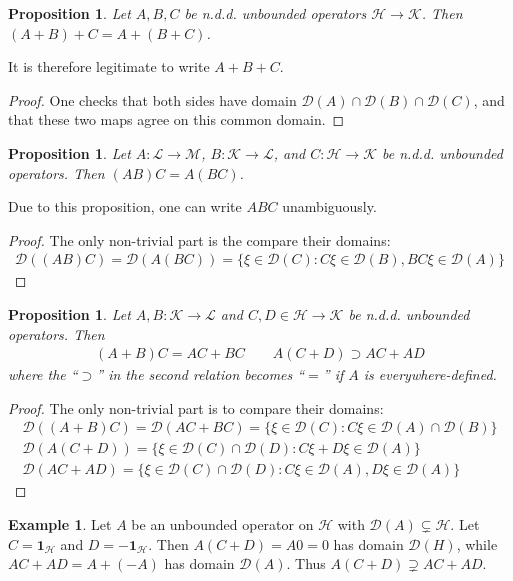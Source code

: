\documentclass[12pt,b5paper,notitlepage]{article}
\theoremstyle{definition}
\newtheorem{eg}[df]{Example}
\theoremstyle{plain}
\newtheorem{pp}[df]{Proposition}
\newcommand{\idt}{\mathbf{1}}
\newcommand{\Dom}{\mathscr{D}}
\newcommand{\MH}{\mathcal H}
\newcommand{\MK}{\mathcal K}
\newcommand{\ML}{\mathcal L}
\newcommand{\MM}{\mathcal M}
\numberwithin{equation}{section}
\begin{document}
\begin{pp}
Let $A,B,C$ be n.d.d. unbounded operators $\MH\rightarrow\MK$. Then $(A+B)+C=A+(B+C)$.
\end{pp}


It is therefore legitimate to write $A+B+C$.

\begin{proof}
One checks that both sides have domain $\Dom(A)\cap\Dom(B)\cap\Dom(C)$, and that these two maps agree on this common domain.
\end{proof}



\begin{pp}
Let $A:\ML\rightarrow\MM$, $B:\MK\rightarrow\ML$, and $C:\MH\rightarrow\MK$ be n.d.d. unbounded operators. Then $(AB)C=A(BC)$.
\end{pp}


Due to this proposition, one can write $ABC$ unambiguously.

\begin{proof}
The only non-trivial part is the compare their domains:
\begin{align*}
\Dom((AB)C)=\Dom(A(BC))=\{\xi\in\Dom(C):C\xi\in\Dom(B),BC\xi\in\Dom(A)\}
\end{align*}
\end{proof}


\begin{pp}
Let $A,B:\MK\rightarrow\ML$ and $C,D\in\MH\rightarrow\MK$ be n.d.d. unbounded operators. Then
\begin{gather}
(A+B)C=AC+BC\qquad A(C+D)\supset AC+AD
\end{gather}
where the ``$\supset$'' in the second relation becomes ``$=$'' if $A$ is everywhere-defined.
\end{pp}



\begin{proof}
The only non-trivial part is to compare their domains:
\begin{gather*}
\Dom((A+B)C)=\Dom(AC+BC)=\{\xi\in\Dom(C):C\xi\in\Dom(A)\cap\Dom(B)\}\\
\Dom(A(C+D))=\{\xi\in\Dom(C)\cap\Dom(D):C\xi+D\xi\in\Dom(A)\}\\
\Dom(AC+AD)=\{\xi\in\Dom(C)\cap\Dom(D):C\xi\in\Dom(A),D\xi\in\Dom(A)\}
\end{gather*}
\end{proof}

\begin{eg}
Let $A$ be an unbounded operator on $\MH$ with $\Dom(A)\subsetneq\MH$. Let $C=\idt_\MH$ and $D=-\idt_\MH$. Then $A(C+D)=A0=0$ has domain $\Dom(H)$, while $AC+AD=A+(-A)$ has domain $\Dom(A)$. Thus $A(C+D)\supsetneq AC+AD$.
\end{eg}
\end{document}
